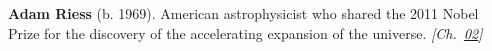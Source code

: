 \nobelphysics \textbf{Adam Riess} (b. 1969). American astrophysicist who shared the 2011 Nobel Prize for the discovery of the accelerating expansion of the universe. \emph{[Ch.~\hyperref[ch:acceleratinguniverse]{02}]}

